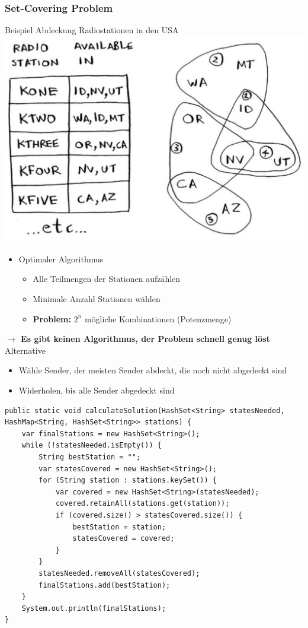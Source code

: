\begin{multicols*}{4}
	\subsubsection{Set-Covering Problem}
	\textcolor{subsectioncolor}{Beispiel Abdeckung Radiostationen in den USA}
	\includegraphics[scale=0.15]{graphic/08_set_covering_radio_stations}
		\begin{itemize}
			\item Optimaler Algorithmus
			\begin{itemize}
				\item Alle Teilmengen der Stationen aufzählen
				\item Minimale Anzahl Stationen wählen
				\item {\bfseries Problem:} $2^n$ mögliche Kombinationen (Potenzmenge)
			\end{itemize}
		\end{itemize}
		{\bfseries $\to$ Es gibt keinen Algorithmus, der Problem schnell genug löst}
		\newline
		\textcolor{subsectioncolor}{Alternative}
		\begin{itemize}
			\item Wähle Sender, der meisten Sender abdeckt, die noch nicht abgedeckt sind
			\item Widerholen, bis alle Sender abgedeckt sind
		\end{itemize}
		\begin{lstlisting}
public static void calculateSolution(HashSet<String> statesNeeded, HashMap<String, HashSet<String>> stations) {
	var finalStations = new HashSet<String>();
	while (!statesNeeded.isEmpty()) {
		String bestStation = "";
		var statesCovered = new HashSet<String>();
		for (String station : stations.keySet()) {
			var covered = new HashSet<String>(statesNeeded);
			covered.retainAll(stations.get(station));
			if (covered.size() > statesCovered.size()) {
				bestStation = station;
				statesCovered = covered;
			}
		}
		statesNeeded.removeAll(statesCovered);
		finalStations.add(bestStation);
	}
	System.out.println(finalStations);
}
		\end{lstlisting}


\end{multicols*}
